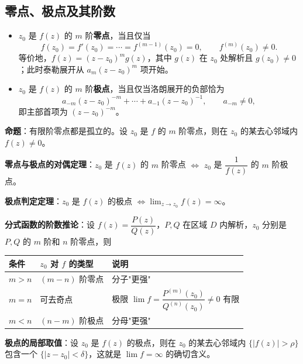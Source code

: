 \subsection{零点、极点及其阶数}

\begin{itemize}
    \item \(z_0\) 是 \(f(z)\) 的 \(m\) 阶\textbf{零点}，当且仅当
    \[
    f(z_0)=f'(z_0)=\cdots=f^{(m-1)}(z_0)=0,\qquad f^{(m)}(z_0)\neq 0 .
    \]
    等价地，\(f(z)=(z-z_0)^m g(z)\)，其中 \(g(z)\) 在 \(z_0\) 处解析且 \(g(z_0)\neq 0\)；此时泰勒展开从 \(a_m(z-z_0)^m\) 项开始。
    \item \(z_0\) 是 \(f(z)\) 的 \(m\) 阶\textbf{极点}，当且仅当洛朗展开的负部恰为
    \[
    a_{-m}(z-z_0)^{-m}+\cdots+a_{-1}(z-z_0)^{-1},\qquad a_{-m}\neq 0,
    \]
    即主部首项为 \((z-z_0)^{-m}\)。
\end{itemize}

\textbf{命题}：有限阶零点都是孤立的。设 \(z_0\) 是 \(f\) 的 \(m\) 阶零点，则在 \(z_0\) 的某去心邻域内 \(f(z)\neq 0\)。

\textbf{零点与极点的对偶定理}：\(z_0\) 是 \(f(z)\) 的 \(m\) 阶零点 \(\iff\) \(z_0\) 是 \(\dfrac{1}{f(z)}\) 的 \(m\) 阶极点。


\textbf{极点判定定理}：\(z_0\) 是 \(f(z)\) 的极点 \(\iff\lim_{z\to z_0}f(z)=\infty\)。

\textbf{分式函数的阶数推论}：设 \(f(z)=\dfrac{P(z)}{Q(z)}\)，\(P,Q\) 在区域 \(D\) 内解析，\(z_0\) 分别是 \(P,Q\) 的 \(m\) 阶和 \(n\) 阶零点，则

\begin{center}
\begin{tabular}{@{}lll@{}}
\toprule
条件 & \(z_0\) 对 \(f\) 的类型 & 说明 \\
\midrule
\(m>n\) & \((m-n)\) 阶零点 & 分子"更强" \\
\(m=n\) & 可去奇点 & 极限 \(\lim f=\dfrac{P^{(m)}(z_0)}{Q^{(n)}(z_0)}\neq 0\) 有限 \\
\(m<n\) & \((n-m)\) 阶极点 & 分母"更强" \\
\bottomrule
\end{tabular}
\end{center}

\textbf{极点的局部取值}：设 \(z_0\) 是 \(f(z)\) 的极点，则在 \(z_0\) 的某去心邻域内 \(\{|f(z)|>\rho\}\) 包含一个 \(\{|z-z_0|<\delta\}\)，这就是 \(\lim f=\infty\) 的确切含义。

